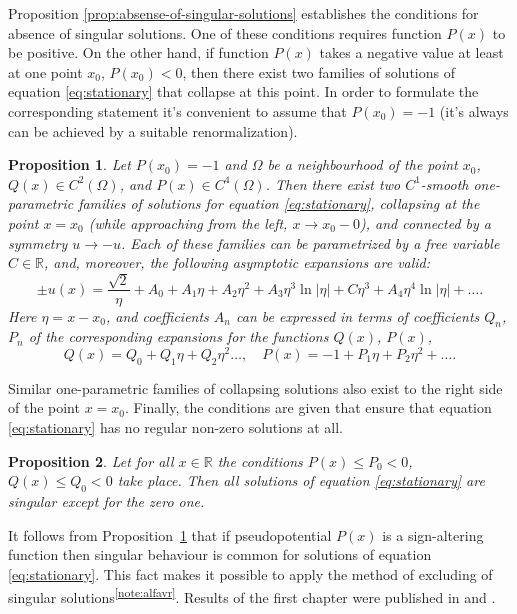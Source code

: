\documentclass[candidate, href, colorlinks]{disser}
\newtheorem{proposition}{Proposition}
\begin{document}
Proposition \ref{prop:absense-of-singular-solutions} establishes the conditions for absence of singular solutions.
One of these conditions requires function $P(x)$ to be positive.
On the other hand, if function $P(x)$ takes a negative value at least at one point $x_0$, $P(x_0) < 0$, then there exist two families of solutions of equation \eqref{eq:stationary} that collapse at this point.
In order to formulate the corresponding statement it's convenient to assume that $P(x_0) = -1$ (it's always can be achieved by a suitable renormalization).

\begin{proposition}
\label{prop:singular-families}
	Let $P(x_0) = -1$ and $\Omega$ be a neighbourhood of the point $x_0$, $Q(x) \in C^2(\Omega)$, and $P(x) \in C^4(\Omega)$.
	Then there exist two $C^1$-smooth one-parametric families of solutions for equation \eqref{eq:stationary}, collapsing at the point $x = x_0$ (while approaching from the left, $x \to x_0{-}0$), and connected by a symmetry $u \to -u$.
	Each of these families can be parametrized by a free variable $C \in \mathbb{R}$, and, moreover, the following asymptotic expansions are valid:
	\begin{equation}
		\pm u(x) = \dfrac{\sqrt{2}}{\eta} + A_0 + A_1 \eta + A_2 \eta^2 + A_3 \eta^3 \ln |\eta| + C \eta^3+ A_4 \eta^4 \ln |\eta| + \dots.
	\label{eq:expansion}
	\end{equation}
	Here $\eta = x - x_0$, and coefficients $A_n$ can be expressed in terms of coefficients $Q_n$, $P_n$ of the corresponding expansions for the functions $Q(x)$, $P(x)$,
	\begin{equation}
		Q(x) = Q_0 + Q_1 \eta + Q_2 \eta^2 \dots, \quad P(x) = -1 + P_1 \eta + P_2 \eta^2 + \dots.
	\end{equation}
\end{proposition}

Similar one-parametric families of collapsing solutions also exist to the right side of the point $x = x_0$.
Finally, the conditions are given that ensure that equation \eqref{eq:stationary} has no regular non-zero solutions at all.

\begin{proposition}
\label{prop:all-solutions-are-singular}
 	Let for all $x \in \mathbb{R}$ the conditions $P(x) \le P_0 < 0$, $Q(x) \le Q_0 < 0$ take place.
 	Then all solutions of equation \eqref{eq:stationary} are singular except for the zero one.
\end{proposition}

It follows from Proposition~\ref{prop:singular-families} that if pseudopotential $P(x)$ is a sign-altering function then singular behaviour is common for solutions of equation \eqref{eq:stationary}.
This fact makes it possible to apply the method of excluding of singular solutions\textsuperscript{\ref{note:alfavr}}.
Results of the first chapter were published in \cite{AlfimovLebedev} and \cite{Ufa2015}.
\end{document}

